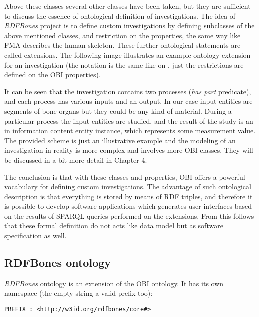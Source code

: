 Above these classes several other classes have been taken, but they are sufficient to discuss the essence of ontological definition of investigations. The idea of \textit{RDFBones} project is to define custom investigations by defining subclasses of the above mentioned classes, and restriction on the properties, the same way like FMA describes the human skeleton. These further ontological statements are called extensions. The following image illustrates an example ontology extension for an investigation (the notation is the same like on , just the restrictions are defined on the OBI properties). 


It can be seen that the investigation contains two processes (\textit{has part} predicate), and each process has various inputs and an output. In our case input entities are segments of bone organs but they could be any kind of material. During a particular process the input entities are studied, and the result of the study is an in information content entity instance, which represents some measurement value. The provided scheme is just an illustrative example and the modeling of an investigation in reality is more complex and involves more OBI classes. They will be discussed in a bit more detail in Chapter 4.

The conclusion is that with these classes and properties, OBI offers a powerful vocabulary for defining custom investigations. The advantage of such ontological description is that everything is stored by means of RDF triples, and therefore it is possible to develop software applications which generates user interfaces based on the results of SPARQL queries performed on the extensions. From this follows that these formal definition do not acts like data model but as software specification as well.

\subsection{RDFBones ontology}


\textit{RDFBones} ontology is an extension of the OBI ontology. It has its own namespace (the empty string a valid prefix too): 

\begin{lstlisting}[basicstyle=\footnotesize, captionpos=b, caption=RDFBones namespace, label=lst:sparql, belowskip=1em, aboveskip=2em,
frame=single]
PREFIX : <http://w3id.org/rdfbones/core#>
\end{lstlisting}

